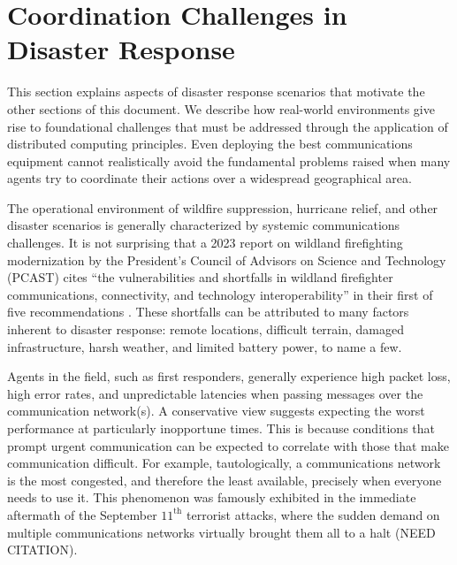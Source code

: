 \documentclass[]             %
{NASA}                       %
\theoremstyle{definition}
\begin{document}
\section{Coordination Challenges in Disaster Response}
\label{sec:disaster-response}

This section explains aspects of disaster response scenarios that
motivate the other sections of this document. We describe how
real-world environments give rise to foundational challenges that must
be addressed through the application of distributed computing
principles. Even deploying the best communications equipment cannot
realistically avoid the fundamental problems raised when many agents
try to coordinate their actions over a widespread geographical area.

The operational environment of wildfire suppression, hurricane relief,
and other disaster scenarios is generally characterized by systemic
communications challenges. It is not surprising that a 2023 report on
wildland firefighting modernization by the President’s Council of
Advisors on Science and Technology (PCAST) cites ``the vulnerabilities
and shortfalls in wildland firefighter communications, connectivity,
and technology interoperability'' in their first of five
recommendations \cite{pcast2023}. These shortfalls can be attributed
to many factors inherent to disaster response: remote locations,
difficult terrain, damaged infrastructure, harsh weather, and limited
battery power, to name a few.

Agents in the field, such as first responders, generally experience
high packet loss, high error rates, and unpredictable latencies when
passing messages over the communication network(s). A conservative
view suggests expecting the worst performance at particularly
inopportune times. This is because conditions that prompt urgent
communication can be expected to correlate with those that make
communication difficult. For example, tautologically, a communications
network is the most \mbox{congested}, and therefore the least
available, precisely when everyone needs to use it. This phenomenon
was famously exhibited in the immediate aftermath of the September
$11^\textrm{th}$ terrorist attacks, where the sudden demand on
multiple communications networks virtually brought them all to a halt
(NEED CITATION).
\end{document}
